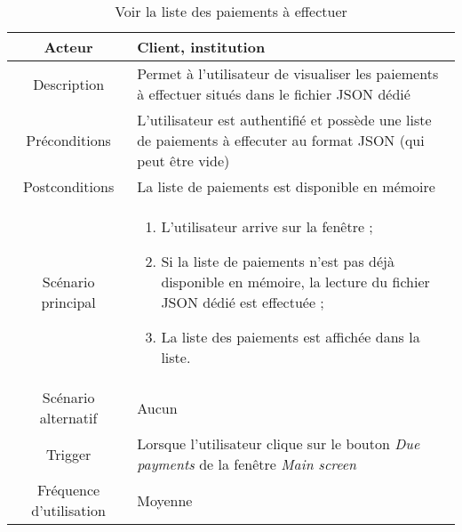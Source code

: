 \documentclass{article}
\begin{document}
\begin{table}

\begin{tabular}{|c|p{11cm}|}
\hline
Acteur & Client, institution \\
\hline
Description & Permet à l'utilisateur de visualiser les paiements à effectuer situés dans le fichier JSON dédié \\
\hline
Préconditions & L'utilisateur est authentifié et possède une liste de paiements à effecuter au format JSON (qui peut être vide) \\
\hline
Postconditions & La liste de paiements est disponible en mémoire \\
\hline
Scénario principal & \begin{enumerate}
\item L'utilisateur arrive sur la fenêtre ;
\item Si la liste de paiements n'est pas déjà disponible en mémoire, la lecture du fichier JSON dédié est effectuée ;
\item La liste des paiements est affichée dans la liste.
\end{enumerate} \\
\hline
Scénario alternatif & Aucun \\
\hline
Trigger & Lorsque l'utilisateur clique sur le bouton \emph{Due payments} de la fenêtre \emph{Main screen} \\
\hline
Fréquence d'utilisation & Moyenne \\
\hline
\end{tabular}

\caption{Voir la liste des paiements à effectuer}

\end{table}
\end{document}
